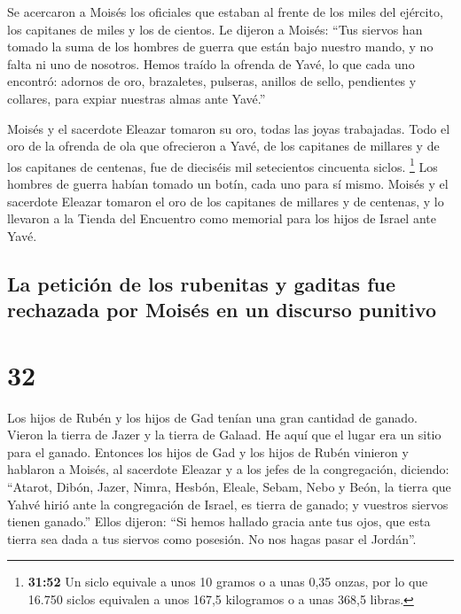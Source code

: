  Se acercaron a Moisés los oficiales que estaban al
frente de los miles del ejército, los capitanes de miles y los de
cientos.  Le dijeron a Moisés: ``Tus siervos han tomado
la suma de los hombres de guerra que están bajo nuestro mando, y no
falta ni uno de nosotros.  Hemos traído la ofrenda de
Yavé, lo que cada uno encontró: adornos de oro, brazaletes, pulseras,
anillos de sello, pendientes y collares, para expiar nuestras almas ante
Yavé.''

 Moisés y el sacerdote Eleazar tomaron su oro, todas las
joyas trabajadas.  Todo el oro de la ofrenda de ola que
ofrecieron a Yavé, de los capitanes de millares y de los capitanes de
centenas, fue de dieciséis mil setecientos cincuenta siclos. \footnote{\textbf{31:52}
  Un siclo equivale a unos 10 gramos o a unas 0,35 onzas, por lo que
  16.750 siclos equivalen a unos 167,5 kilogramos o a unas 368,5 libras.}
 Los hombres de guerra habían tomado un botín, cada uno
para sí mismo.  Moisés y el sacerdote Eleazar tomaron el
oro de los capitanes de millares y de centenas, y lo llevaron a la
Tienda del Encuentro como memorial para los hijos de Israel ante Yavé.

\hypertarget{la-peticiuxf3n-de-los-rubenitas-y-gaditas-fue-rechazada-por-moisuxe9s-en-un-discurso-punitivo}{%
\subsection{La petición de los rubenitas y gaditas fue rechazada por
Moisés en un discurso
punitivo}\label{la-peticiuxf3n-de-los-rubenitas-y-gaditas-fue-rechazada-por-moisuxe9s-en-un-discurso-punitivo}}

\hypertarget{section-31}{%
\section{32}\label{section-31}}

 Los hijos de Rubén y los hijos de Gad tenían una gran
cantidad de ganado. Vieron la tierra de Jazer y la tierra de Galaad. He
aquí que el lugar era un sitio para el ganado.  Entonces
los hijos de Gad y los hijos de Rubén vinieron y hablaron a Moisés, al
sacerdote Eleazar y a los jefes de la congregación, diciendo:
 ``Atarot, Dibón, Jazer, Nimra, Hesbón, Eleale, Sebam,
Nebo y Beón,  la tierra que Yahvé hirió ante la
congregación de Israel, es tierra de ganado; y vuestros siervos tienen
ganado.''  Ellos dijeron: ``Si hemos hallado gracia ante
tus ojos, que esta tierra sea dada a tus siervos como posesión. No nos
hagas pasar el Jordán''.

